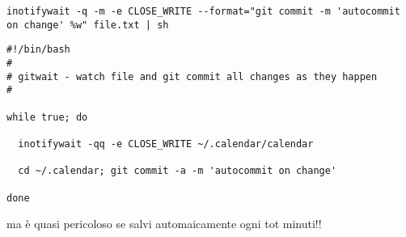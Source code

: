 \documentclass[a4paper,12pt,oneside]{article}
\begin{document}
\begin{lstlisting}
inotifywait -q -m -e CLOSE_WRITE --format="git commit -m 'autocommit on change' %w" file.txt | sh
\end{lstlisting}

\begin{lstlisting}
#!/bin/bash
#
# gitwait - watch file and git commit all changes as they happen
#

while true; do

  inotifywait -qq -e CLOSE_WRITE ~/.calendar/calendar

  cd ~/.calendar; git commit -a -m 'autocommit on change'

done
\end{lstlisting}

ma è quasi pericoloso se salvi automaicamente ogni tot minuti!!
\end{document}
